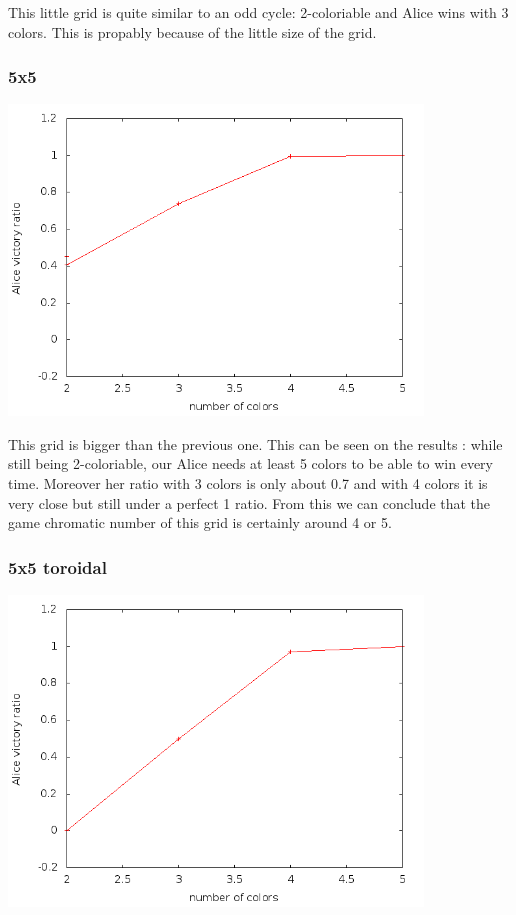This little grid is quite similar to an odd cycle: 2-coloriable and Alice wins with 3 colors. This is propably because of the little size of the grid.

\subsubsection{5x5}

\includegraphics[width=11cm]{resultats/grille55.png}

This grid is bigger than the previous one. This can be seen on the results : while still being 2-coloriable, our Alice needs at least 5 colors to be able to win every time. Moreover her ratio with 3 colors is only about 0.7 and with 4 colors it is very close but still under a perfect 1 ratio. From this we can conclude that the game chromatic number of this grid is certainly around 4 or 5.

\subsubsection{5x5 toroidal}

\includegraphics[width=11cm]{resultats/grilletor55.png}

